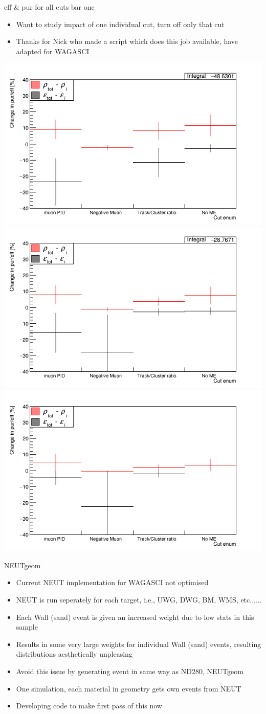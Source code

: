 \documentclass{beamer}
\begin{document}
\begin{frame}{eff \& pur for all cuts bar one}
    \begin{itemize}
        \item Want to study impact of one individual cut, turn off only that cut
        \item Thanks for Nick who made a script which does this job available, have adapted for WAGASCI
    \end{itemize}
    \center
    \includegraphics[width=.45\textwidth]{images/nMinusOneCuts_sample2.png}
    \includegraphics[width=.45\textwidth]{images/nMinusOneCuts_sample1.png}
    \includegraphics[width=.45\textwidth]{images/nMinusOneCuts_sample0.png}
\end{frame}

\begin{frame}{NEUTgeom}
    \begin{itemize}
        \item Current NEUT implementation for WAGASCI not optimised
        \item NEUT is run seperately for each target, i.e., UWG, DWG, BM, WMS, etc......
        \item Each Wall (sand) event is given an increased weight due to low stats in this sample
        \item Results in some very large weights for individual Wall (sand) events, resulting distributions aesthetically unpleasing
        \item Avoid this issue by generating event in same way as ND280, NEUTgeom
        \item One simulation, each material in geometry gets own events from NEUT
        \item Developing code to make first pass of this now
    \end{itemize}
\end{frame}
\end{document}
